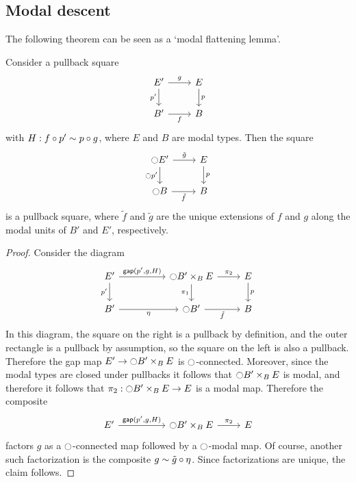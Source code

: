 \subsection{Modal descent}

The following theorem can be seen as a `modal flattening lemma'.
\begin{thm}\label{thm:etale_flattening}
Consider a pullback square
\begin{equation*}
\begin{tikzcd}
E' \arrow[d,swap,"{p'}"] \arrow[r,"g"] & E \arrow[d,"p"] \\
B' \arrow[r,swap,"f"] & B
\end{tikzcd}
\end{equation*}
with $H:f\circ p'\sim p\circ g$, where $E$ and $B$ are modal types. Then the square
\begin{equation*}
\begin{tikzcd}
\modal E' \arrow[r,"\tilde{g}"] \arrow[d,swap,"{\modal p'}"] & E \arrow[d,"p"] \\
\modal B \arrow[r,swap,"\tilde{f}"] & B
\end{tikzcd}
\end{equation*}
is a pullback square, where $\tilde{f}$ and $\tilde{g}$ are the unique extensions of $f$ and $g$ along the modal units of $B'$ and $E'$, respectively.
\end{thm}

\begin{proof}
Consider the diagram
\begin{equation*}
\begin{tikzcd}
E' \arrow[r,"{\mathsf{gap}(p',g,H)}"] \arrow[d,swap,"{p'}"] &[2.5em] \modal B'\times_{B} E \arrow[r,"\pi_2"] \arrow[d,swap,"\pi_1"] & E \arrow[d,"p"] \\
B' \arrow[r,swap,"\modalunit"] & \modal B' \arrow[r,swap,"\tilde{f}"] & B
\end{tikzcd}
\end{equation*}
In this diagram, the square on the right is a pullback by definition, and the outer rectangle is a pullback by assumption, so the square on the left is also a pullback. Therefore the gap map $E'\to {\ensuremath{\ocircle}} B'\times_B E$ is ${\ocircle}$-connected. Moreover, since the modal types are closed under pullbacks it follows that ${\ocircle} B'\times_B E$ is modal, and therefore it follows that $\pi_2:{\ocircle} B'\times_B E\to E$ is a modal map. Therefore the composite
\begin{equation*}
\begin{tikzcd}
E' \arrow[r,"{\mathsf{gap}(p',g,H)}"] &[2.5em] \modal B'\times_{B} E \arrow[r,"\pi_2"] & E 
\end{tikzcd}
\end{equation*}
factors $g$ as a ${\ocircle}$-connected map followed by a ${\ocircle}$-modal map. Of course, another such factorization is the composite $g\sim \tilde{g}\circ{\eta_{}}$. Since factorizations are unique, the claim follows.
\end{proof}

